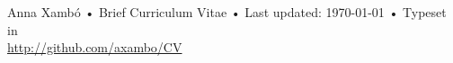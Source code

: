 \documentclass[10pt, a4paper]{article}
\begin{document}

\begin{center}
{\scriptsize  Anna Xambó •\- Brief Curriculum Vitae •\- Last updated: \today\- •\- %
Typeset in \href{http://nitens.org/taraborelli/cvtex}{
\XeTeX }\\
\href{http://github.com/axambo/CV}{http://github.com/axambo/CV}}
\end{center}
\end{document}
